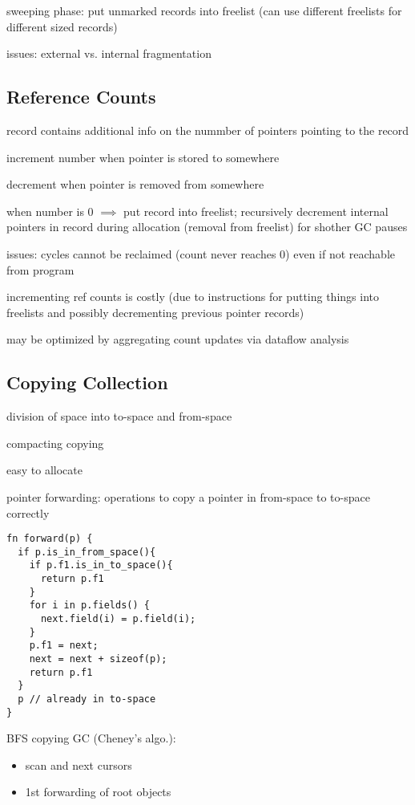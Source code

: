 \documentclass[8pt]{extarticle}
\begin{document}
\begin{multicols*}{2}
  sweeping phase: put unmarked records into freelist (can use different freelists for different sized records)

  issues: external vs. internal fragmentation

  \subsection{Reference Counts}

  record contains additional info on the nummber of pointers pointing to the record

  increment number when pointer is stored to somewhere

  decrement when pointer is removed from somewhere

  when number is 0 $\implies$ put record into freelist; recursively decrement internal pointers in record during allocation (removal from freelist) for shother GC pauses

  issues: cycles cannot be reclaimed (count never reaches 0) even if not reachable from program

  incrementing ref counts is costly (due to instructions for putting things into freelists and possibly decrementing previous pointer records)

  may be optimized by aggregating count updates via dataflow analysis

  \subsection{Copying Collection}

  division of space into to-space and from-space

  compacting copying

  easy to allocate

  pointer forwarding: operations to copy a pointer in from-space to to-space correctly

\begin{verbatim}
fn forward(p) {
  if p.is_in_from_space(){
    if p.f1.is_in_to_space(){
      return p.f1
    }
    for i in p.fields() {
      next.field(i) = p.field(i);
    }
    p.f1 = next;
    next = next + sizeof(p);
    return p.f1
  }
  p // already in to-space
}
\end{verbatim}
  
  BFS copying GC (Cheney's algo.):
  \begin{itemize}
  \item scan and next cursors
  \item 1st forwarding of root objects
  \end{itemize}


\end{multicols*}
\end{document}
